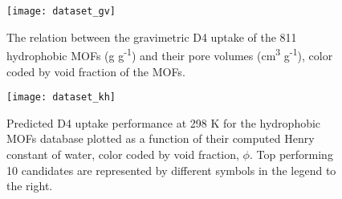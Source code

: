 \begin{figure}[H]
    \centering
    \texttt{[image: dataset\_gv]}
    \caption{%
        The relation between the gravimetric D4 uptake of the 811 hydrophobic MOFs
        (g g\textsuperscript{-1}) and their pore volumes
        (cm\textsuperscript{3} g\textsuperscript{-1}), color coded by void fraction of the
        MOFs.
    }\label{fig:d4-screening-grav-volum}
\end{figure}

\begin{figure}[H]
    \centering
    \texttt{[image: dataset\_kh]}
    \caption{%
        Predicted D4 uptake performance at 298 K for the hydrophobic MOFs
        database plotted as a function of their computed Henry constant of
        water, color coded by void fraction, \(\phi\). Top performing 10
        candidates are represented by different symbols in the legend to the
        right.
    }\label{fig:d4-screening-henryc}
\end{figure}

\pagebreak


